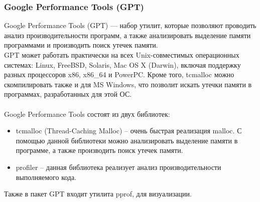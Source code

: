 \documentclass[pdf, unicode, 12pt, a4paper,oneside,fleqn]{article}
\begin{document}
\subsubsection{Google Performance Tools (GPT)}
Google Performance Tools (GPT) — набор утилит, которые позволяют проводить анализ производительности программ, а также анализировать выделение памяти программами и производить поиск утечек памяти.\\
GPT может работать практически на всех Unix-совместимых операционных системах: Linux, FreeBSD, Solaris, Mac OS X (Darwin), включая поддержку разных процессоров  x86, x86\_64 и PowerPC. Кроме того, tcmalloc можно скомпилировать также и для MS Windows, что позволит искать утечки памяти в программах, разработанных для этой ОС.\\\\
Google Performance Tools состоят из двух библиотек:
\begin{itemize}
\item tcmalloc (Thread-Caching Malloc) -- очень быстрая реализация malloc. С помощью данной библиотеки можно анализировать выделение памяти в программе, а также производить поиск утечек памяти.
\item profiler -- данная библиотека реализует анализ производительности выполняемого кода.
\end{itemize}

Также в пакет GPT входит утилита pprof, для визуализации. 
\newpage
\end{document}
